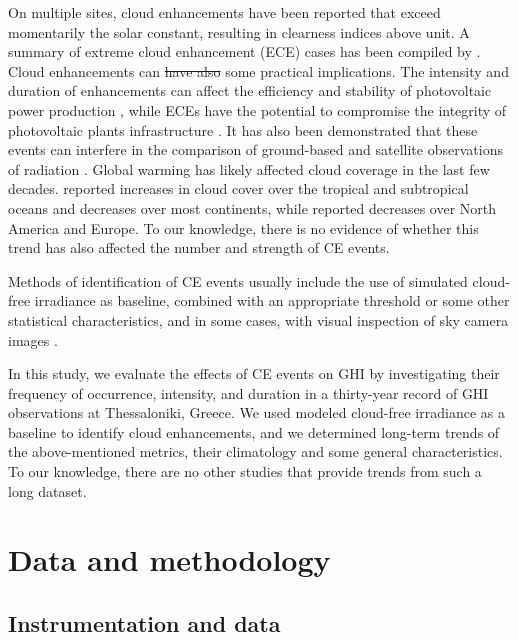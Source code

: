 \documentclass[preprint, 5p,
authoryear]{elsarticle} %
\providecommand{\DIFaddtex}[1]{{\protect\color{blue}\uwave{#1}}} %
\providecommand{\DIFdeltex}[1]{{\protect\color{red}\sout{#1}}}                      %
\providecommand{\DIFaddbegin}{} %
\providecommand{\DIFaddend}{} %
\providecommand{\DIFdelbegin}{} %
\providecommand{\DIFdelend}{} %
\providecommand{\DIFadd}[1]{\texorpdfstring{\DIFaddtex{#1}}{#1}} %
\providecommand{\DIFdel}[1]{\texorpdfstring{\DIFdeltex{#1}}{}} %
\newcommand{\DIFscaledelfig}{0.5}
\newlength{\DIFdelgraphicswidth} %
\newlength{\DIFdelgraphicsheight} %
\newcommand{\DIFaddincludegraphics}[2][]{{\color{blue}\fbox{\DIFOincludegraphics[#1]{#2}}}} %
\newcommand{\DIFdelincludegraphics}[2][]{%
\sbox{\DIFdelgraphicsbox}{\DIFOincludegraphics[#1]{#2}}%
\settoboxwidth{\DIFdelgraphicswidth}{\DIFdelgraphicsbox} %
\settoboxtotalheight{\DIFdelgraphicsheight}{\DIFdelgraphicsbox} %
\scalebox{\DIFscaledelfig}{%
\parbox[b]{\DIFdelgraphicswidth}{\usebox{\DIFdelgraphicsbox}\\[-\baselineskip] \rule{\DIFdelgraphicswidth}{0em}}\llap{\resizebox{\DIFdelgraphicswidth}{\DIFdelgraphicsheight}{%
\setlength{\unitlength}{\DIFdelgraphicswidth}%
\begin{picture}(1,1)%
\thicklines\linethickness{2pt} %
{\color[rgb]{1,0,0}\put(0,0){\framebox(1,1){}}}%
{\color[rgb]{1,0,0}\put(0,0){\line( 1,1){1}}}%
{\color[rgb]{1,0,0}\put(0,1){\line(1,-1){1}}}%
\end{picture}%
}\hspace*{3pt}}} %
} %
\DeclareRobustCommand{\DIFaddbegin}{\DIFOaddbegin \let\includegraphics\DIFaddincludegraphics} %
\DeclareRobustCommand{\DIFaddend}{\DIFOaddend \let\includegraphics\DIFOincludegraphics} %
\DeclareRobustCommand{\DIFdelbegin}{\DIFOdelbegin \let\includegraphics\DIFdelincludegraphics} %
\DeclareRobustCommand{\DIFdelend}{\DIFOaddend \let\includegraphics\DIFOincludegraphics} %
\begin{document}
On multiple sites, cloud enhancements have been reported that exceed
momentarily the solar constant, resulting in clearness indices above
unit. A summary of extreme cloud enhancement (ECE) cases has been
compiled by \citet{Martins2022}. Cloud enhancements can \DIFdelbegin \DIFdel{have also }\DIFdelend \DIFaddbegin \DIFadd{also have }\DIFaddend some
practical implications. The intensity and duration of enhancements can
affect the efficiency and stability of photovoltaic power production
\citep{Lappalainen2020, Jaervelae2020}, while ECEs have the potential to
compromise the integrity of photovoltaic plants infrastructure
\citep{DoNascimento2019}. It has also been demonstrated that these
events can interfere in the comparison of ground-based and satellite
observations of radiation \citep{Damiani2018}. Global warming has likely
affected cloud coverage in the last few decades. \citet{Liu2023}
reported increases in cloud cover over the tropical and subtropical
oceans and decreases over most continents, while \citet{Dong2023}
reported decreases over North America and Europe. To our knowledge,
there is no evidence of whether this trend has also affected the number
and strength of CE events.

Methods of identification of CE events usually include the use of
simulated cloud-free irradiance as baseline, combined with an
appropriate threshold or some other statistical characteristics, and in
some cases, with visual inspection of sky camera images \citep[ and
references therein]{Vamvakas2020, Mol2023}.

In this study, we evaluate the effects of CE events on GHI by
investigating their frequency of occurrence, intensity, and duration in
a thirty-year record of GHI observations at Thessaloniki, Greece. We
used modeled cloud-free irradiance as a baseline to identify cloud
enhancements, and we determined long-term trends of the above-mentioned
metrics, their climatology and some general characteristics. To our
knowledge, there are no other studies that provide trends from such a
long dataset.

\hypertarget{data-and-methodology}{%
\section{Data and methodology}\label{data-and-methodology}}

\hypertarget{instrumentation-and-data}{%
\subsection{Instrumentation and data}\label{instrumentation-and-data}}
\end{document}
